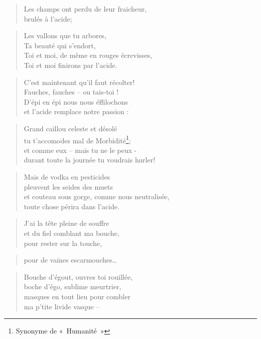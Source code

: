  \begin{verse}
    Les champs ont perdu de leur fraicheur,\\
    brulés à l’acide;
  \end{verse}
  \begin{verse}
    Les vallons que tu arbores,\\
    Ta beauté qui s’endort,\\
    Toi et moi, de même en rouges écrevisses,\\
    Toi et moi finirons par l’acide.
  \end{verse}
  \begin{verse}
    C’est maintenant qu’il faut récolter!\\
    Fauches, fauches – ou tais-toi !\\
    D’épi en épi nous nous éffilochons\\
    et l’acide remplace notre passion :
  \end{verse}
  \begin{verse}
    Grand caillou celeste et désolé\\
    tu t’accomodes mal de Morbidité\footnote{Synonyme de «~Humanité~»};\\
    et comme eux – mais tu ne le peux -\\
    durant toute la journée tu voudrais hurler!
  \end{verse}
  \begin{verse}
    Mais de vodka en pesticides\\
    pleuvent les seides des muets\\
    et couteau sous gorge, comme nous neutralisée,\\
    toute chose périra dans l’acide.
  \end{verse}
  \begin{verse}
    J’ai la tête pleine de souffre\\
    et du fiel comblant ma bouche,\\
    pour rester sur la touche,
  \end{verse}
  \begin{verse}
    pour de vaines escarmouches…
  \end{verse}
  \begin{verse}
    Bouche d’égout, ouvres toi rouillée,\\
    boche d’égo, sublime meurtrier,\\
    masques en tout lieu pour combler\\
    ma p’tite livide vasque --
  \end{verse}
